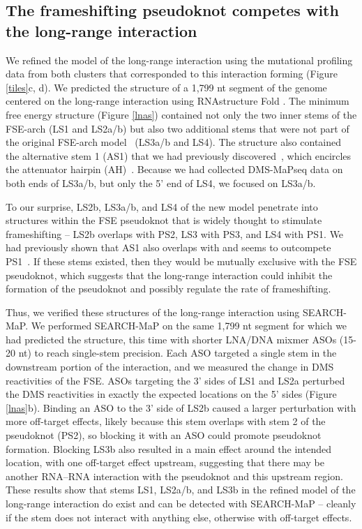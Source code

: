 \documentclass[main.tex]{subfiles}
\begin{document}
\subsection{The frameshifting pseudoknot competes with the long-range interaction}

We refined the model of the long-range interaction using the mutational profiling data from both clusters that corresponded to this interaction forming (Figure \ref{tiles}c, d).
We predicted the structure of a 1,799 nt segment of the genome centered on the long-range interaction using RNAstructure Fold \cite{Mathews2004a}.
The minimum free energy structure (Figure \ref{lnas}) contained not only the two inner stems of the FSE-arch (LS1 and LS2a/b) but also two additional stems that were not part of the original FSE-arch model~\cite{Ziv2020} (LS3a/b and LS4).
The structure also contained the alternative stem 1 (AS1) that we had previously discovered~\cite{Lan2022}, which encircles the attenuator hairpin (AH)~\cite{Su2005}.
Because we had collected DMS-MaPseq data on both ends of LS3a/b, but only the 5' end of LS4, we focused on LS3a/b.

To our surprise, LS2b, LS3a/b, and LS4 of the new model penetrate into structures within the FSE pseudoknot that is widely thought to stimulate frameshifting -- LS2b overlaps with PS2, LS3 with PS3, and LS4 with PS1.
We had previously shown that AS1 also overlaps with and seems to outcompete PS1~\cite{Lan2022}.
If these stems existed, then they would be mutually exclusive with the FSE pseudoknot, which suggests that the long-range interaction could inhibit the formation of the pseudoknot and possibly regulate the rate of frameshifting.

Thus, we verified these structures of the long-range interaction using SEARCH-MaP.
We performed SEARCH-MaP on the same 1,799 nt segment for which we had predicted the structure, this time with shorter LNA/DNA mixmer ASOs (15-20 nt) to reach single-stem precision.
Each ASO targeted a single stem in the downstream portion of the interaction, and we measured the change in DMS reactivities of the FSE.
ASOs targeting the 3' sides of LS1 and LS2a perturbed the DMS reactivities in exactly the expected locations on the 5' sides (Figure \ref{lnas}b).
Binding an ASO to the 3' side of LS2b caused a larger perturbation with more off-target effects, likely because this stem overlaps with stem 2 of the pseudoknot (PS2), so blocking it with an ASO could promote pseudoknot formation.
Blocking LS3b also resulted in a main effect around the intended location, with one off-target effect upstream, suggesting that there may be another RNA--RNA interaction with the pseudoknot and this upstream region.
These results show that stems LS1, LS2a/b, and LS3b in the refined model of the long-range interaction do exist and can be detected with SEARCH-MaP -- cleanly if the stem does not interact with anything else, otherwise with off-target effects.
\end{document}
